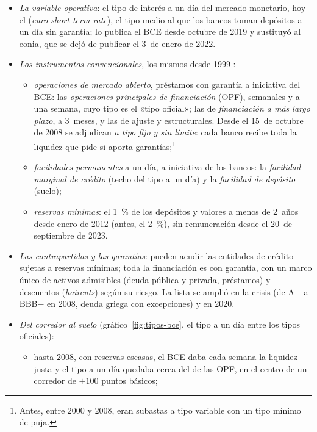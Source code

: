 \documentclass[11pt]{article}
\begin{document}
\begin{itemize}
\item \emph{La variable operativa}: el tipo de interés a un día del mercado monetario, hoy el  (\emph{euro short-term rate}), el tipo medio al que los bancos toman depósitos a un día sin garantía; lo publica el BCE desde octubre de 2019 y sustituyó al eonia, que se dejó de publicar el 3~de enero de 2022\nocite{BCE2026ESTR}.
\item \emph{Los instrumentos convencionales}, los mismos desde 1999\nocite{BdE2026Instrumentos} :
  \begin{itemize}
  \item \emph{operaciones de mercado abierto}, préstamos con garantía a iniciativa del BCE: las \emph{operaciones principales de financiación} (OPF), semanales y a una semana, cuyo tipo es el «tipo oficial»; las de \emph{financiación a más largo plazo}, a 3~meses, y las de ajuste y estructurales. Desde el 15~de octubre de 2008 se adjudican \emph{a tipo fijo y sin límite}: cada banco recibe toda la liquidez que pide si aporta garantías;\footnote{Antes, entre 2000 y 2008, eran subastas a tipo variable con un tipo mínimo de puja.}
  \item \emph{facilidades permanentes} a un día, a iniciativa de los bancos: la \emph{facilidad marginal de crédito} (techo del tipo a un día) y la \emph{facilidad de depósito} (suelo);
  \item \emph{reservas mínimas}: el 1~\% de los depósitos y valores a menos de 2~años desde enero de 2012 (antes, el 2~\%), sin remuneración desde el 20~de septiembre de 2023\nocite{BCE2023Reservas}.
  \end{itemize}
\item \emph{Las contrapartidas y las garantías}: pueden acudir las entidades de crédito sujetas a reservas mínimas; toda la financiación es con garantía, con un marco único de activos admisibles (deuda pública y privada, préstamos) y descuentos (\emph{haircuts}) según su riesgo. La lista se amplió en la crisis (de A$-$ a BBB$-$ en 2008, deuda griega con excepciones) y en 2020.
\item \emph{Del corredor al suelo} (gráfico~\ref{fig:tipos-bce}, el tipo a un día entre los tipos oficiales):
  \begin{itemize}
  \item hasta 2008, con reservas escasas, el BCE daba cada semana la liquidez justa y el tipo a un día quedaba cerca del de las OPF, en el centro de un corredor de $\pm100$ puntos básicos;

\end{itemize}
\end{itemize}
\end{document}

